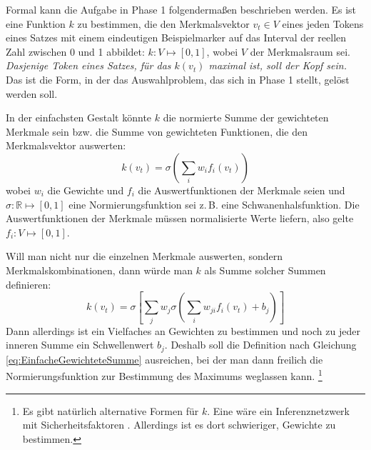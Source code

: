 \documentclass{article}
\renewcommand*{\see}{\autocap{v}gl\adddot}%
\begin{document}
Formal kann die Aufgabe in Phase 1 folgendermaßen beschrieben
werden. Es ist eine Funktion $k$ zu bestimmen, die den Merkmalsvektor
$v_t\in V$ eines jeden Tokens eines Satzes mit einem eindeutigen
Beispielmarker auf das Interval der reellen Zahl zwischen 0 und 1
abbildet: $k:V \mapsto [0,1]$, wobei $V$ der Merkmalsraum
sei. \emph{Dasjenige Token eines Satzes, für das $k(v_t)$ maximal ist,
  soll der Kopf sein.} Das ist die Form, in der das Auswahlproblem,
das sich in Phase 1 stellt, gelöst werden soll.

In der einfachsten Gestalt könnte $k$ die normierte Summe der
gewichteten Merkmale sein bzw. die Summe von gewichteten Funktionen,
die den Merkmalsvektor auswerten:
\begin{equation}
\label{eq:EinfacheGewichteteSumme}
k(v_t) = \sigma \left( \sum\limits_iw_if_i(v_t) \right)
\end{equation}
wobei $w_i$ die Gewichte und $f_i$ die Auswertfunktionen der Merkmale
seien und $\sigma:\mathbb{R}\mapsto [0,1]$ eine Normierungsfunktion sei
z.\,B. eine Schwanenhalsfunktion. Die Auswertfunktionen der Merkmale
müssen normalisierte Werte liefern, also gelte $f_i:V\mapsto [0,1]$.

Will man nicht nur die einzelnen Merkmale auswerten, sondern
Merkmalskombinationen, dann würde man $k$ als Summe solcher Summen
definieren:
\begin{equation}
  k(v_t) = \sigma\left[ \sum\limits_jw_j\sigma \left( \sum\limits_iw_{ji}f_i(v_t) +b_j\right)\right]
\end{equation}
Dann allerdings ist ein Vielfaches an Gewichten zu bestimmen und noch
zu jeder inneren Summe ein Schwellenwert $b_j$. Deshalb soll die
Definition nach Gleichung \ref{eq:EinfacheGewichteteSumme} ausreichen,
bei der man dann freilich die Normierungsfunktion zur Bestimmung des
Maximums weglassen kann.%
\footnote{Es gibt natürlich alternative Formen für $k$. Eine wäre ein
  Inferenznetzwerk mit
  Sicherheitsfaktoren \parencite[\see][90--96]{Beierle2014a}. Allerdings
  ist es dort schwieriger, Gewichte zu bestimmen.}
\end{document}
